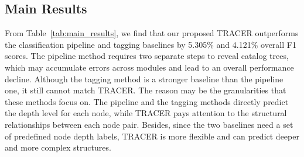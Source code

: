\documentclass[runningheads]{llncs}
\begin{document}
\subsection{Main Results}

\begin{table}[t]
    \centering
    \caption{Main results on ChCatExt. The scores are calculated via the method described in \S~\ref{sec:exp_metrics}. Please beware the overall scores are NOT the average of Heading and Text scores. Heading and Text scores are obtained from a subset of predicted tuple results, where all the node types are ``Heading'' or ``Text''. The overall scores are calculated from the universal set, so they are often lower than the Heading and Text scores. WikiBert represents the PLM that is trained on the wiki corpus in advance.}
    \label{tab:main_results}
\end{table}

From Table~\ref{tab:main_results}, we find that our proposed TRACER outperforms the classification pipeline and tagging baselines by 5.305\% and 4.121\% overall F1 scores.
The pipeline method requires two separate steps to reveal catalog trees, which may accumulate errors across modules and lead to an overall performance decline.
Although the tagging method is a stronger baseline than the pipeline one, it still cannot match TRACER.
The reason may be the granularities that these methods focus on.
The pipeline and the tagging methods directly predict the depth level for each node, while TRACER pays attention to the structural relationships between each node pair.
Besides, since the two baselines need a set of predefined node depth labels, TRACER is more flexible and can predict deeper and more complex structures.
\end{document}
